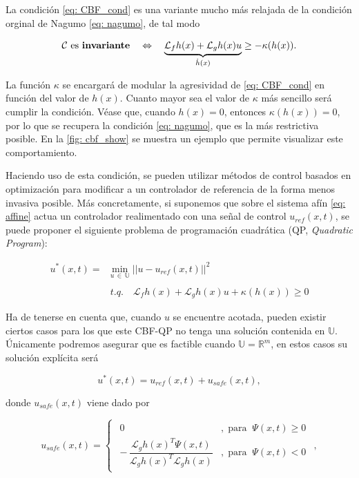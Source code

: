 La condición \eqref{eq: CBF_cond} es una variante mucho más relajada de la condición orginal de Nagumo \eqref{eq: nagumo}, de tal modo


$$
    \mathcal{C} \text{ es \textbf{invariante}} \quad \Leftrightarrow \quad \underbrace{\mathcal{L}_f h(x) + \mathcal{L}_g h(x)u}_{\dot h(x)} \geq - \kappa(h(x)). 
$$

La función $\kappa$ se encargará de modular la agresividad de \eqref{eq: CBF_cond} en función del valor de $h(x)$. Cuanto mayor sea el valor de $\kappa$ más sencillo será cumplir la condición. Véase que, cuando $h(x) = 0$, entonces $\kappa(h(x)) = 0$, por lo que se recupera la condición \eqref{eq: nagumo}, que es la más restrictiva posible. En la \autoref{fig: cbf_show} se muestra un ejemplo que permite visualizar este comportamiento.

Haciendo uso de esta condición, se pueden utilizar métodos de control basados en optimización para modificar a un controlador de referencia de la forma menos invasiva posible. Más concretamente, si suponemos que sobre el sistema afín \eqref{eq: affine} actua un controlador realimentado con una señal de control $u_{ref}(x,t)$, se puede proponer el siguiente problema de programación cuadrática (QP, \textit{Quadratic Program}):

\begin{equation} \label{eq: CBF-QP}
    \begin{array}{rl}
        u^*(x,t) = & \underset{u \, \in \, \mathds{U}}{\text{min}} \; ||u - u_{ref}(x,t)||^2 \\
        \\
               & t.q. \quad \mathcal{L}_f h(x) + \mathcal{L}_g h(x)u + \kappa(h(x)) \geq 0
    \end{array}
\end{equation}

Ha de tenerse en cuenta que, cuando $u$ se encuentre acotada, pueden existir ciertos casos para los que este CBF-QP no tenga una solución contenida en $\mathds{U}$. Únicamente podremos asegurar que es factible cuando $\mathds{U} = \mathds{R}^m$, en estos casos su solución explícita será

$$u^*(x,t) = u_{ref}(x,t) + u_{safe}(x,t),$$

donde $u_{safe}(x,t)$ viene dado por 

\begin{equation} \label{eq: u_safe}
	u_{safe}(x,t) = 
    \begin{cases}
        \begin{array}{ll}
            0 &, \; \text{para} \;\; \Psi(x,t) \geq 0\\
            - \, \dfrac{\mathcal{L}_g h(x)^T \Psi(x,t)}{\mathcal{L}_g h(x)^T \mathcal{L}_g h(x)} &, \; \text{para} \;\; \Psi(x,t) < 0
        \end{array}
    \end{cases},
\end{equation}

